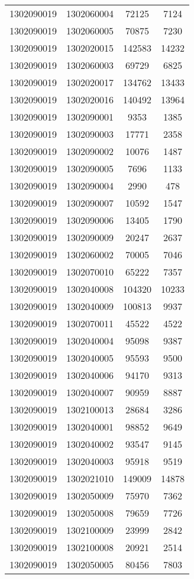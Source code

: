 \begin{longtable}{llcc}
1302090019 & 1302060004 & 72125 & 7124\\
1302090019 & 1302060005 & 70875 & 7230\\
1302090019 & 1302020015 & 142583 & 14232\\
1302090019 & 1302060003 & 69729 & 6825\\
1302090019 & 1302020017 & 134762 & 13433\\
1302090019 & 1302020016 & 140492 & 13964\\
1302090019 & 1302090001 & 9353 & 1385\\
1302090019 & 1302090003 & 17771 & 2358\\
1302090019 & 1302090002 & 10076 & 1487\\
1302090019 & 1302090005 & 7696 & 1133\\
1302090019 & 1302090004 & 2990 & 478\\
1302090019 & 1302090007 & 10592 & 1547\\
1302090019 & 1302090006 & 13405 & 1790\\
1302090019 & 1302090009 & 20247 & 2637\\
1302090019 & 1302060002 & 70005 & 7046\\
1302090019 & 1302070010 & 65222 & 7357\\
1302090019 & 1302040008 & 104320 & 10233\\
1302090019 & 1302040009 & 100813 & 9937\\
1302090019 & 1302070011 & 45522 & 4522\\
1302090019 & 1302040004 & 95098 & 9387\\
1302090019 & 1302040005 & 95593 & 9500\\
1302090019 & 1302040006 & 94170 & 9313\\
1302090019 & 1302040007 & 90959 & 8887\\
1302090019 & 1302100013 & 28684 & 3286\\
1302090019 & 1302040001 & 98852 & 9649\\
1302090019 & 1302040002 & 93547 & 9145\\
1302090019 & 1302040003 & 95918 & 9519\\
1302090019 & 1302021010 & 149009 & 14878\\
1302090019 & 1302050009 & 75970 & 7362\\
1302090019 & 1302050008 & 79659 & 7726\\
1302090019 & 1302100009 & 23999 & 2842\\
1302090019 & 1302100008 & 20921 & 2514\\
1302090019 & 1302050005 & 80456 & 7803\\

\end{longtable}
